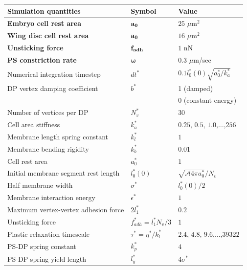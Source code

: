 \documentclass[%
 reprint,
superscriptaddress,
 amsmath,amssymb,
pre,
]{revtex4-2}
\begin{document}
\begin{table}[t]
  \centering
  \begin{tabularx}{\textwidth}{|X|X|X|}
    \hline
    \textbf{Simulation quantities} & \textbf{Symbol} & \textbf{Value} \\
    \hline
    \textbf{Embryo cell rest area} &  $\bf{a_0}$ & $25$ $\mu$m$^2$ \\ 
    \hline
    \textbf{Wing disc cell rest area} & $\bf{a_0}$ & $16$ $\mu$m$^2$ \\
    \hline
    \textbf{Unsticking force} & $\bf{f_{adh}}$ & $1$ nN \cite{krieg2008tensile}\\ 
    \hline
    \textbf{PS constriction rate} & $\bm{\omega}$ & $0.3$ $\mu$m/sec \cite{biron2005molecular, stachowiak2014mechanism}\\ 
    \hline
    Numerical integration timestep & $dt^*$ & $0.1 l_0^*(0) \sqrt{a_0^*/k_a^*}$\\ 
    \hline
    DP vertex damping coefficient & $b^*$ & 1 (damped) \\ 
    & & 0 (constant energy)\\
    \hline
    Number of vertices per DP & $N_v^*$ & $30$ \\ 
    \hline
    Cell area stiffness & $k_a^*$ & $0.25$, $0.5$, $1.0$,$\ldots$,$256$ \\
    \hline
    Membrane length spring constant & $k_l^*$ & $1$ \\ 
    \hline
    Membrane bending rigidity & $k_b^*$ & $0.01$ \\ 
    \hline
    Cell rest area & $a_0^*$ & $1$ \\
    \hline
    Initial membrane segment rest length & $l_0^*(0)$ & $\sqrt{\mathcal{A}4\pi a_0^*}/N_v$ \\ 
    \hline
    Half membrane width & $\sigma^*$ & $l_0^*(0)/2$ \\ 
    \hline
    Membrane interaction energy & $\epsilon^*$ & $1$ \\ 
    \hline
    Maximum vertex-vertex adhesion force & $2l_1^*$ & $0.2$ \\ 
    \hline
    Unsticking force & $f_{adh}^* = l_1^* N_v/3$ & $1$ \\ 
    \hline
    Plastic relaxation timescale & $\tau^* = \eta^* / k_l^*$ & $2.4$, $4.8$, $9.6$,$\ldots$,$39322$ \\ 
    \hline
    PS-DP spring constant & $k_p^*$ & $4$ \\ 
    \hline
    PS-DP spring yield length & $l_y^*$ & 4$\sigma^*$ \\ 

\end{tabularx}
\end{table}
\end{document}
